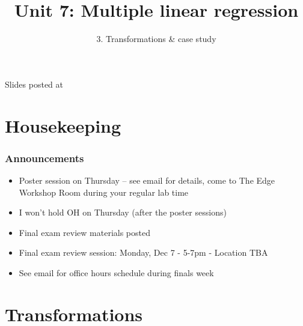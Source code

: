 \documentclass[slidestop,compress,mathserif,12pt,t,professionalfonts,xcolor=table]{beamer}
\title{Unit 7: Multiple linear regression}
\subtitle{3. Transformations \& case study}
\author{\CourseName}
\date{}
\institute{\InstituteName}
\begin{document}



\begin{frame}[plain]

\titlepage

\vfill

{\scriptsize {} \hfill Slides posted at  \webURL{\CourseSite}}

\addtocounter{framenumber}{-1} 

\end{frame}


\section{Housekeeping}


\begin{frame}
\frametitle{Announcements}

\begin{itemize}

\item Poster session on Thursday -- see email for details, come to The Edge Workshop Room during
your regular lab time

\item I won't hold OH on Thursday (after the poster sessions)

\item Final exam review materials posted

\item Final exam review session:  Monday, Dec 7 - 5-7pm - Location TBA

\item See email for office hours schedule during finals week

\end{itemize}

\end{frame}


\section{Transformations}

\end{document}

